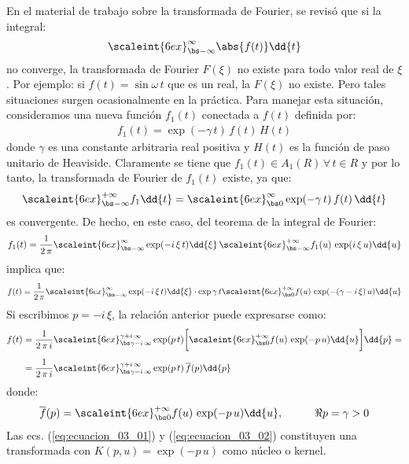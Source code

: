 En el material de trabajo sobre la transformada de Fourier, se revisó que si la integral:
\begin{align*}
\scaleint{6ex}_{\bs -\infty}^{\infty} \abs{f (t)} \dd{t}
\end{align*}
no converge, la transformada de Fourier $F(\xi)$ no existe para todo valor real de $\xi$. Por ejemplo: si $f (t) = \sin \omega \, t$ que es un real, la $F (\xi)$ no existe. Pero tales situaciones surgen ocasionalmente en la práctica. Para manejar esta situación, consideramos una nueva función $f_{1} (t)$ conectada a $f (t)$ definida por:
\begin{align*}
f_{1} (t) =  \exp(- \gamma \, t) \, f (t) \, H (t)
\end{align*}
donde $\gamma$ es una constante arbitraria real positiva y $H (t)$ es la función de paso unitario de Heaviside. Claramente se tiene que $f_{1} (t) \in A_{1} (R) \, \forall \, t \in R$ y por lo tanto, la transformada de Fourier de $f_{1} (t)$ existe, ya que:
\begin{align*}
\scaleint{6ex}_{\bs -\infty}^{+\infty} f_{1} \dd{t} = \scaleint{6ex}_{\bs 0}^{\infty} \exp(-\gamma \, t) \, f (t) \, \dd{t}
\end{align*}
es convergente. De hecho, en este caso, del teorema de la integral de Fourier:
\begin{align*}
f_{1} (t) = \dfrac{1}{2 \, \pi} \scaleint{6ex}_{\bs -\infty}^{\infty} \exp(-i \, \xi \, t) \dd{\xi} \, \scaleint{6ex}_{\bs -\infty}^{+\infty} f_{1} (u) \, \exp(i \, \xi \, u) \dd{u}
\end{align*}
implica que:
\begin{align*}
f (t) = \dfrac{1}{2 \, \pi} \scaleint{6ex}_{\bs -\infty}^{\infty} \exp(-i \, \xi \, t) \dd{\xi} \cdot \exp{\gamma \, t} \scaleint{6ex}_{\bs 0}^{+\infty} f (u) \, \exp(- (\gamma - i \, \xi) \, u) \dd{u}
\end{align*}
Si escribimos $p = - i \, \xi$, la relación anterior puede expresarse como:
\begin{align}
\begin{aligned}[b]
f (t) &= \dfrac{1}{2 \, \pi \, i} \scaleint{6ex}_{\bs \gamma -i \, \infty}^{\gamma + i \, \infty} \exp(p \, t) \bigg[ \scaleint{6ex}_{\bs 0}^{+\infty} f (u) \, \exp(- p \, u) \dd{u} \bigg] \dd{p} = \\[0.5em]
&= \dfrac{1}{2 \, \pi \, i} \scaleint{6ex}_{\bs \gamma -i \, \infty}^{\gamma + i \, \infty} \exp(p \, t) \, \overline{f} (p) \dd{p} 
\end{aligned}
\label{eq:ecuacion_03_01}
\end{align}
donde:
\begin{align}
\overline{f} (p) = \scaleint{6ex}_{\bs 0}^{+\infty} f (u) \, \exp(- p \, u) \dd{u}, \hspace{1cm} \Re{p} = \gamma > 0
\label{eq:ecuacion_03_02}
\end{align}
Las ecs. (\ref{eq:ecuacion_03_01}) y (\ref{eq:ecuacion_03_02}) constituyen una transformada con $K (p, u) = \exp(- p \, u)$ como núcleo o kernel.

